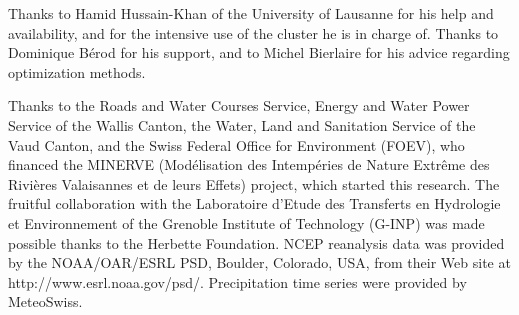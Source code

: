 \documentclass{ametsoc}
\begin{document}
%
\acknowledgments
Thanks to Hamid Hussain-Khan of the University of Lausanne for his help and availability, and for the intensive use of the cluster he is in charge of. Thanks to Dominique B\'{e}rod for his support, and to Michel Bierlaire for his advice regarding optimization methods.

Thanks to the Roads and Water Courses Service, Energy and Water Power Service of the Wallis Canton, the Water, Land and Sanitation Service of the Vaud Canton, and the Swiss Federal Office for Environment (FOEV), who financed the MINERVE (Mod\'{e}lisation des Intemp\'{e}ries de Nature Extr\^{e}me des Rivi\`{e}res Valaisannes et de leurs Effets) project, which started this research. The fruitful collaboration with the Laboratoire d'Etude des Transferts en Hydrologie et Environnement of the Grenoble Institute of Technology (G-INP) was made possible thanks to the Herbette Foundation. NCEP reanalysis data was provided by the NOAA/OAR/ESRL PSD, Boulder, Colorado, USA, from their Web site at http://www.esrl.noaa.gov/psd/. Precipitation time series were provided by MeteoSwiss. 


%




\end{document}
